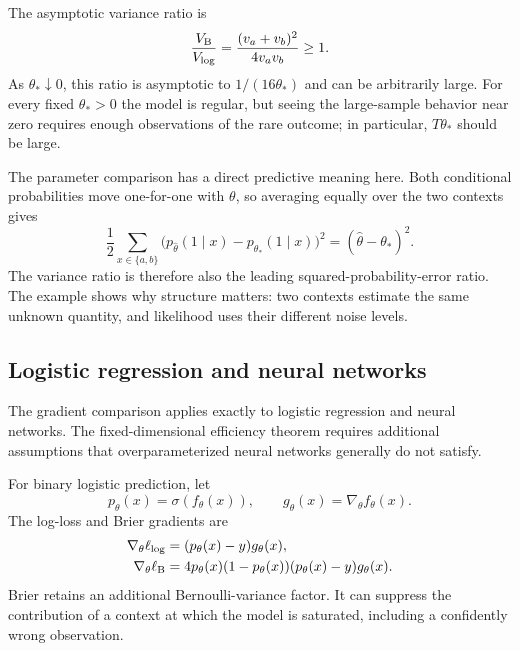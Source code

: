 \documentclass[11pt,twoside]{article}
\theoremstyle{definition}
\theoremstyle{remark}
\begin{document}
The asymptotic variance ratio is
\begin{equation}
\frac{V_{\rm B}}{V_{\log}}
=\frac{(v_a+v_b)^2}{4v_av_b}\ge1.
\label{eq:efficiency-ratio}
\end{equation}
As $\theta_*\downarrow0$, this ratio is asymptotic to
$1/(16\theta_*)$ and can be arbitrarily large. For every fixed
$\theta_*>0$ the model is regular, but seeing the large-sample behavior near
zero requires enough observations of the rare outcome; in particular,
$T\theta_*$ should be large.

The parameter comparison has a direct predictive meaning here. Both
conditional probabilities move one-for-one with $\theta$, so averaging
equally over the two contexts gives
\begin{equation}
\frac12\sum_{x\in\{a,b\}}
\bigl(p_{\widehat\theta}(1\mid x)-p_{\theta_*}(1\mid x)\bigr)^2
=(\widehat\theta-\theta_*)^2.
\label{eq:parameter-is-prediction}
\end{equation}
The variance ratio is therefore also the leading squared-probability-error
ratio. The example shows why structure matters: two contexts estimate the same
unknown quantity, and likelihood uses their different noise levels.

\subsection{Logistic regression and neural networks}
\label{sec:efficiency-neural-networks}

The gradient comparison applies exactly to logistic regression and neural
networks. The fixed-dimensional efficiency theorem requires additional
assumptions that overparameterized neural networks generally do not satisfy.

For binary logistic prediction, let
\begin{equation}
p_\theta(x)=\sigma(f_\theta(x)),
\qquad
g_\theta(x)=\nabla_\theta f_\theta(x).
\label{eq:binary-logistic-model}
\end{equation}
The log-loss and Brier gradients are
\begin{align}
\nabla_\theta\ell_{\log}
&=(p_\theta(x)-y)g_\theta(x),
\label{eq:binary-log-gradient}\\
\nabla_\theta\ell_{\rm B}
&=4p_\theta(x)(1-p_\theta(x))
(p_\theta(x)-y)g_\theta(x).
\label{eq:binary-brier-gradient}
\end{align}
Brier retains an additional Bernoulli-variance factor. It can suppress the
contribution of a context at which the model is saturated, including a
confidently wrong observation.
\end{document}
